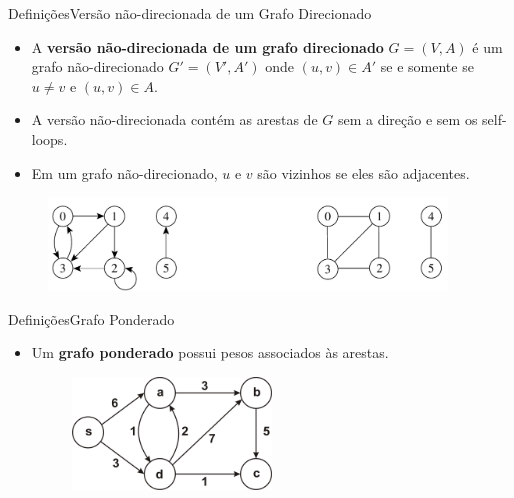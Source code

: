 \documentclass[aspectratio=169]{beamer}
\begin{document}

\begin{frame}{Definições}{Versão não-direcionada de um Grafo Direcionado}
\begin{itemize}
\item A {\bf versão não-direcionada de um grafo direcionado} $G = (V, A)$ é um grafo não-direcionado $G' = (V' , A' )$ onde $(u, v) \in A'$ se e somente se
$u \neq v$ e $(u, v) \in A$.
\item A versão não-direcionada contém as arestas de $G$ sem a direção e sem os self-loops.
\item Em um grafo não-direcionado, $u$ e $v$ são vizinhos se eles são adjacentes.
\end{itemize}
\begin{figure}[!h]
  \centering
  \includegraphics[width=300pt]{imagens/exemplo_versao_nao_direcionada.png}
  \label{fig_exemplo_versao_nao_direcionada}
\end{figure}
\end{frame}


\begin{frame}{Definições}{Grafo Ponderado}
\begin{itemize}
\item Um {\bf grafo ponderado} possui pesos associados às arestas.
\begin{figure}[!h]
  \centering
  \includegraphics[width=150pt]{imagens/exemplo_grafo_ponderado.jpg}
  \label{fig_exemplo_grafo_ponderado}
\end{figure}
\end{itemize}
\end{frame}
\end{document}
